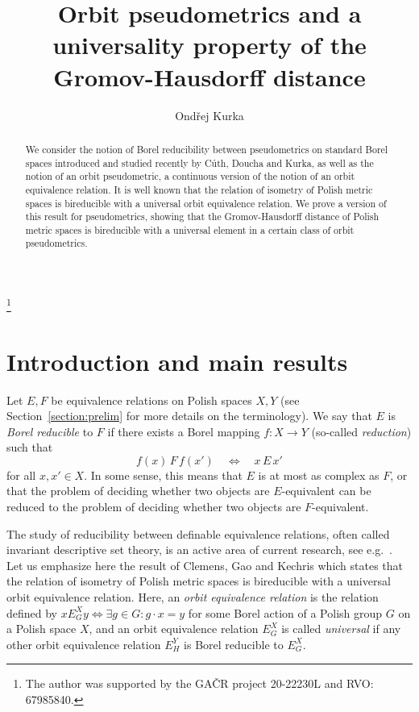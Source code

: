 \documentclass[a4paper]{amsart}
\theoremstyle{plain}
\theoremstyle{remark}
\begin{document}
\title[A universality property]{Orbit pseudometrics and a universality property of the Gromov-Hausdorff distance}
\author{Ond\v{r}ej Kurka}
\thanks{The author was supported by the GA\v{C}R project 20-22230L and RVO: 67985840.}
\address{Institute of Mathematics, Czech Academy of Sciences, \v{Z}itn\'a 25, 115 67 Prague~1, Czech Republic}
\begin{abstract}
We consider the notion of Borel reducibility between pseudometrics on standard Borel spaces introduced and studied recently by C\'{u}th, Doucha and Kurka, as well as the notion of an orbit pseudometric, a continuous version of the notion of an orbit equivalence relation. It is well known that the relation of isometry of Polish metric spaces is bireducible with a universal orbit equivalence relation. We prove a version of this result for pseudometrics, showing that the Gromov-Hausdorff distance of Polish metric spaces is bireducible with a universal element in a certain class of orbit pseudometrics.
\end{abstract}
\maketitle




\section{Introduction and main results}


Let $ E, F $ be equivalence relations on Polish spaces $ X, Y $ (see Section~\ref{section:prelim} for more details on the terminology). We say that $ E $ is \emph{Borel reducible} to $ F $ if there exists a Borel mapping $ f : X \to Y $ (so-called \emph{reduction}) such that
$$ f(x) \, F \, f(x') \quad \Leftrightarrow \quad x \, E \, x' $$
for all $ x, x' \in X $. In some sense, this means that $ E $ is at most as complex as $ F $, or that the problem of deciding whether two objects are $ E $-equivalent can be reduced to the problem of deciding whether two objects are $ F $-equivalent.

The study of reducibility between definable equivalence relations, often called invariant descriptive set theory, is an active area of current research, see e.g.~\cite{gao}. Let us emphasize here the result of Clemens, Gao and Kechris \cite{clemens, gaokech} which states that the relation of isometry of Polish metric spaces is bireducible with a universal orbit equivalence relation. Here, an \emph{orbit equivalence relation} is the relation defined by $ x E^{X}_{G} y \Leftrightarrow \exists g \in G : g \cdot x = y $ for some Borel action of a Polish group $ G $ on a Polish space $ X $, and an orbit equivalence relation $ E^{X}_{G} $ is called \emph{universal} if any other orbit equivalence relation $ E^{Y}_{H} $ is Borel reducible to $ E^{X}_{G} $.
\end{document}
